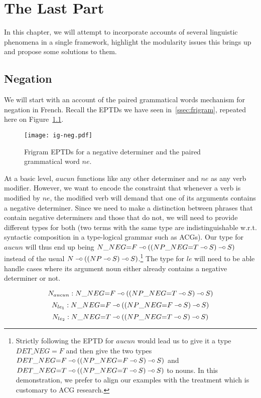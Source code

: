 \chapter{The Last Part}

In this chapter, we will attempt to incorporate accounts of several
linguistic phenomena in a single framework, highlight the modularity
issues this brings up and propose some solutions to them.


\section{Negation}

We will start with an account of the paired grammatical words mechanism
for negation in French. Recall the EPTDs we have seen
in~\ref{ssec:frigram}, repeated here on Figure~\ref{fig:ig-neg-rep}.

\begin{figure}
  \centering
  \texttt{[image: ig-neg.pdf]}
  \caption{\label{fig:ig-neg-rep} Frigram EPTDs for a negative
    determiner and the paired grammatical word $ne$.}
\end{figure}

At a basic level, $aucun$ functions like any other determiner and $ne$
as any verb modifier. However, we want to encode the constraint that
whenever a verb is modified by $ne$, the modified verb will demand that
one of its arguments contains a negative determiner. Since we need to
make a distinction between phrases that contain negative determiners and
those that do not, we will need to provide different types for both (two
terms with the same type are indistinguishable w.r.t. syntactic
composition in a type-logical grammar such as ACGs). Our type for
$aucun$ will thus end up being $N\_NEG{=}F \mathbin{{-}\mkern-3.5mu{\circ}} ((NP\_NEG{=}T \mathbin{{-}\mkern-3.5mu{\circ}} S)
\mathbin{{-}\mkern-3.5mu{\circ}} S)$ instead of the usual $N \mathbin{{-}\mkern-3.5mu{\circ}} ((NP \mathbin{{-}\mkern-3.5mu{\circ}} S) \mathbin{{-}\mkern-3.5mu{\circ}}
S)$.\footnote{Strictly following the EPTD for $aucun$ would lead us to
  give it a type $DET\_NEG{=}F$ and then give the two types
  $DET\_NEG{=}F \mathbin{{-}\mkern-3.5mu{\circ}} ((NP\_NEG{=}F \mathbin{{-}\mkern-3.5mu{\circ}} S) \mathbin{{-}\mkern-3.5mu{\circ}} S)$ and $DET\_NEG{=}T
  \mathbin{{-}\mkern-3.5mu{\circ}} ((NP\_NEG{=}T \mathbin{{-}\mkern-3.5mu{\circ}} S) \mathbin{{-}\mkern-3.5mu{\circ}} S)$ to nouns. In this
  demonstration, we prefer to align our examples with the treatment
  which is customary to ACG research.} The type for $le$ will need to be
able handle cases where its argument noun either already contains a
negative determiner or not.

$$
N_{aucun} : N\_NEG{=}F \mathbin{{-}\mkern-3.5mu{\circ}} ((NP\_NEG{=}T \mathbin{{-}\mkern-3.5mu{\circ}} S) \mathbin{{-}\mkern-3.5mu{\circ}} S)
$$
$$
N_{le_1} : N\_NEG{=}F \mathbin{{-}\mkern-3.5mu{\circ}} ((NP\_NEG{=}F \mathbin{{-}\mkern-3.5mu{\circ}} S) \mathbin{{-}\mkern-3.5mu{\circ}} S)
$$
$$
N_{le_2} : N\_NEG{=}T \mathbin{{-}\mkern-3.5mu{\circ}} ((NP\_NEG{=}T \mathbin{{-}\mkern-3.5mu{\circ}} S) \mathbin{{-}\mkern-3.5mu{\circ}} S)
$$


